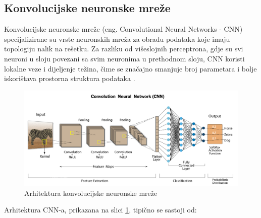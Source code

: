 \documentclass[zavrsnirad]{fer}
\begin{document}
\subsection{Konvolucijske neuronske mreže}
\label{pog:konvolucijske_neuronske_mreze}
Konvolucijske neuronske mreže (eng. Convolutional Neural Networks - CNN) specijalizirane su vrste neuronskih mreža za obradu podataka koje imaju topologiju nalik na rešetku. 
Za razliku od višeslojnih perceptrona, gdje su svi neuroni u sloju povezani sa svim neuronima u prethodnom sloju, CNN koristi lokalne veze i dijeljenje težina, čime se značajno smanjuje broj parametara i bolje iskorištava prostorna struktura podataka \cite{Goodfellow-et-al-2016}.
\begin{figure}[H]
  \centering
  \includegraphics[width=\textwidth]{Figures/cnn_arh.png}
  \caption{Arhitektura konvolucijske neuronske mreže \cite{haque2023cnn}}
  \label{fig:cnn_architecture}
\end{figure}
\noindent Arhitektura CNN-a, prikazana na slici \ref{fig:cnn_architecture}, tipično se sastoji od:
\end{document}
